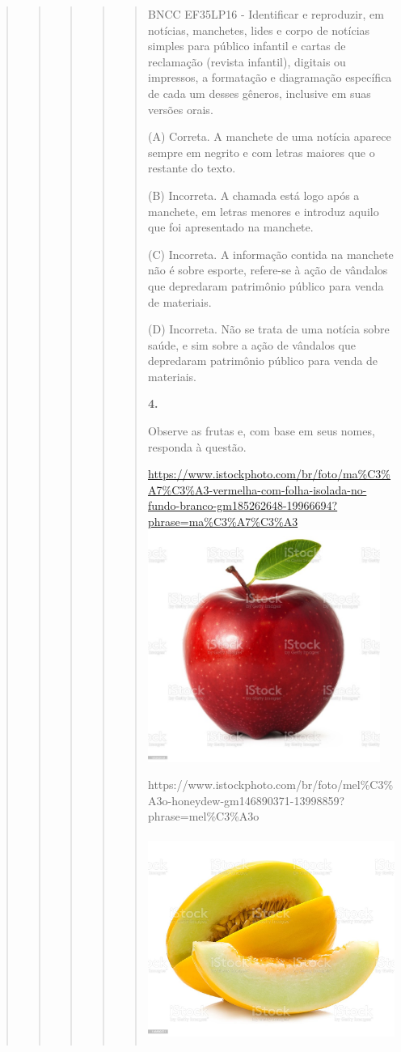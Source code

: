 \begin{quote}
\begin{quote}
\begin{quote}
\begin{quote}
\begin{quote}
BNCC EF35LP16 - Identificar e reproduzir, em notícias, manchetes, lides
e corpo de notícias simples para público infantil e cartas de reclamação
(revista infantil), digitais ou impressos, a formatação e diagramação
específica de cada um desses gêneros, inclusive em suas versões orais.

(A) Correta. A manchete de uma notícia aparece sempre em negrito e com
letras maiores que o restante do texto.

(B) Incorreta. A chamada está logo após a manchete, em letras menores e
introduz aquilo que foi apresentado na manchete.

(C) Incorreta. A informação contida na manchete não é sobre esporte,
refere-se à \protect\hypertarget{_Hlk128473874}{}{}ação de vândalos que
depredaram patrimônio público para venda de materiais.

(D) Incorreta. Não se trata de uma notícia sobre saúde, e sim sobre a
ação de vândalos que depredaram patrimônio público para venda de
materiais.

\textbf{4.}

Observe as frutas e, com base em seus nomes, responda à questão.

\href{https://www.istockphoto.com/br/foto/ma\%C3\%A7\%C3\%A3-vermelha-com-folha-isolada-no-fundo-branco-gm185262648-19966694?phrase=ma\%C3\%A7\%C3\%A3}{https://www.istockphoto.com/br/foto/ma\%C3\%A7\%C3\%A3-vermelha-com-folha-isolada-no-fundo-branco-gm185262648-19966694?phrase=ma\%C3\%A7\%C3\%A3\includegraphics[width=2.98958in,height=2.98958in]{media/image38.jpeg}}

https://www.istockphoto.com/br/foto/mel\%C3\%A3o-honeydew-gm146890371-13998859?phrase=mel\%C3\%A3o

\includegraphics[width=3.33412in,height=2.64722in]{media/image39.jpeg}


\end{quote}
\end{quote}
\end{quote}
\end{quote}
\end{quote}

